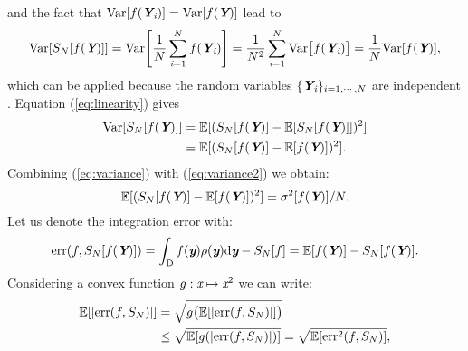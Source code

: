 and the fact that $\textrm{Var}[f(\textit{\textbf{Y}}_{\textit{i}})] = \textrm{Var}[f(\textit{\textbf{Y}})]$ lead to
\begin{equation}\label{eq:variance}
\textrm{Var}[S_{N}[f(\textit{\textbf{Y}})]]= \textrm{Var}\Bigg[\frac{1}{N}\sum_{\textit{i}=1}^{N}f(\textit{\textbf{Y}}_{\textit{i}})\Bigg] =
 \frac{1}{N^2}\sum_{\textit{i}=1}^{N}\textrm{Var}\big[f(\textit{\textbf{Y}}_{\textit{i}})\big] = \frac{1}{N}\textrm{Var}[f(\textit{\textbf{Y}})],
\end{equation}
which can be applied because the random variables $\{\textit{\textbf{Y}}_{\textit{i}}\}_{i = 1, \cdots, N}$ are independent \cite{grinstead2012introduction}. 
Equation (\ref{eq:linearity}) gives
\begin{equation}\label{eq:variance2}
\begin{aligned}
\textrm{Var}[S_N[f(\textit{\textbf{Y}})]] &= \mathbb{E}[(S_{N}[f(\textit{\textbf{Y}})]-\mathbb{E}[S_{N}[f(\textit{\textbf{Y}})]])^2]\\ &= \mathbb{E}[(S_{N}[f(\textit{\textbf{Y}})]-\mathbb{E}[f(\textit{\textbf{Y}})])^2].
\end{aligned}
\end{equation}
Combining (\ref{eq:variance}) with (\ref{eq:variance2}) we obtain:
\begin{equation}\label{eq:variance3}
\mathbb{E}[(S_{N}[f(\textit{\textbf{Y}})]-\mathbb{E}[f(\textit{\textbf{Y}})])^2] = \sigma^2[f(\textit{\textbf{Y}})]/N.
\end{equation}
Let us denote the integration error with:
\begin{equation}\label{eq:error1}
\textrm{err}(f, S_{N}[f(\textit{\textbf{Y}})]) =\int_{\textup{D}}f(\textit{\textbf{y}})\rho(\textit{\textbf{y}}) \textrm{d}\textit{\textbf{y}}-S_{N}[f] = \mathbb{E}[f(\textit{\textbf{Y}})]-S_N[f(\textit{\textbf{Y}})].
\end{equation}
Considering a convex function $g:\textit{x}\mapsto\textit{x}^2$ we can write:
\begin{equation}
\begin{aligned}
\mathbb{E}[|\textrm{err}(f, S_{N})|] &= \sqrt{g\big(\mathbb{E}[|\textrm{err}(f, S_{N})|]\big)} \\&\leq\sqrt{\mathbb{E}[g(|\textrm{err}(f, S_{N})|)]} = \sqrt{\mathbb{E}[\textrm{err}^2(f, S_{N})]},
\end{aligned}
\end{equation} 
